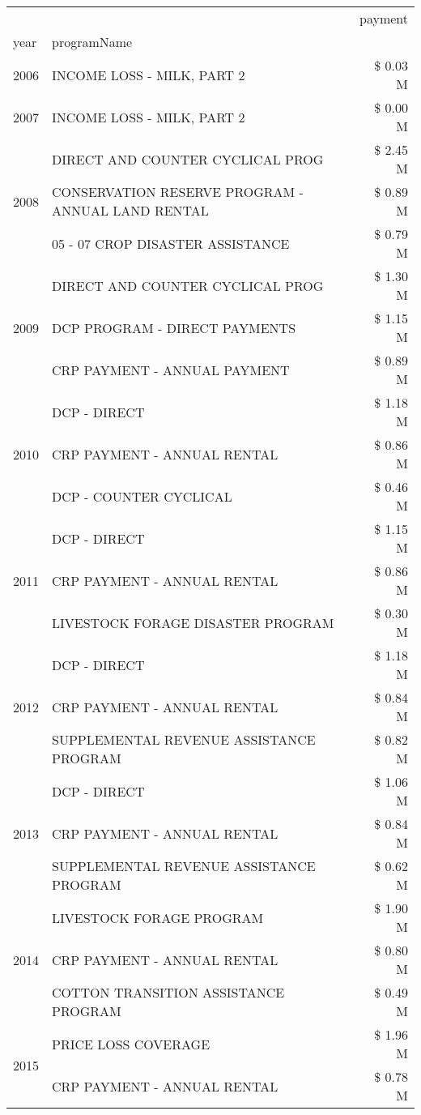 \begin{tabular}{llr}
\toprule
 &  & payment \\
year & programName &  \\
\midrule
2006 & INCOME LOSS - MILK, PART 2 & \$ 0.03 M \\
\cline{1-3}
2007 & INCOME LOSS - MILK, PART 2 & \$ 0.00 M \\
\cline{1-3}
\multirow[t]{3}{*}{2008} & DIRECT AND COUNTER CYCLICAL PROG & \$ 2.45 M \\
 & CONSERVATION RESERVE PROGRAM - ANNUAL LAND RENTAL & \$ 0.89 M \\
 & 05 - 07 CROP DISASTER ASSISTANCE & \$ 0.79 M \\
\cline{1-3}
\multirow[t]{3}{*}{2009} & DIRECT AND COUNTER CYCLICAL PROG & \$ 1.30 M \\
 & DCP PROGRAM - DIRECT PAYMENTS & \$ 1.15 M \\
 & CRP PAYMENT - ANNUAL PAYMENT & \$ 0.89 M \\
\cline{1-3}
\multirow[t]{3}{*}{2010} & DCP - DIRECT & \$ 1.18 M \\
 & CRP PAYMENT - ANNUAL RENTAL & \$ 0.86 M \\
 & DCP - COUNTER CYCLICAL & \$ 0.46 M \\
\cline{1-3}
\multirow[t]{3}{*}{2011} & DCP - DIRECT & \$ 1.15 M \\
 & CRP PAYMENT - ANNUAL RENTAL & \$ 0.86 M \\
 & LIVESTOCK FORAGE DISASTER PROGRAM & \$ 0.30 M \\
\cline{1-3}
\multirow[t]{3}{*}{2012} & DCP - DIRECT & \$ 1.18 M \\
 & CRP PAYMENT - ANNUAL RENTAL & \$ 0.84 M \\
 & SUPPLEMENTAL REVENUE ASSISTANCE PROGRAM & \$ 0.82 M \\
\cline{1-3}
\multirow[t]{3}{*}{2013} & DCP - DIRECT & \$ 1.06 M \\
 & CRP PAYMENT - ANNUAL RENTAL & \$ 0.84 M \\
 & SUPPLEMENTAL REVENUE ASSISTANCE PROGRAM & \$ 0.62 M \\
\cline{1-3}
\multirow[t]{3}{*}{2014} & LIVESTOCK FORAGE PROGRAM & \$ 1.90 M \\
 & CRP PAYMENT - ANNUAL RENTAL & \$ 0.80 M \\
 & COTTON TRANSITION ASSISTANCE PROGRAM & \$ 0.49 M \\
\cline{1-3}
\multirow[t]{3}{*}{2015} & PRICE LOSS COVERAGE & \$ 1.96 M \\
 & CRP PAYMENT - ANNUAL RENTAL & \$ 0.78 M \\

\end{tabular}
